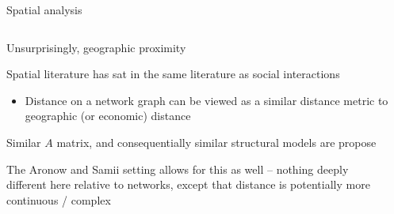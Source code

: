 \documentclass[notes,11pt, aspectratio=169]{beamer}
\newenvironment{wideitemize}{\itemize\addtolength{\itemsep}{10pt}}{\enditemize}
\begin{document}
\begin{frame}{Spatial analysis}
\begin{columns}[T] %
  \begin{column}{.7\textwidth}
    \begin{wideitemize}
    \item Unsurprisingly, geographic proximity
    \item Spatial literature has sat in the same literature as social interactions
      \begin{itemize}
      \item Distance on a network graph can be viewed as a similar
        distance metric to geographic (or economic) distance
      \end{itemize}
    \item Similar $A$ matrix, and consequentially similar structural models are propose
    \item The Aronow and Samii setting allows for this as well --
      nothing deeply different here relative to networks, except that
      distance is potentially more continuous / complex
    \end{wideitemize}
  \end{column}%
  \hfill%
  \begin{column}{.5\textwidth}
    \begin{center}
    \end{center}
  \end{column}
\end{columns}

\end{frame}
\end{document}
